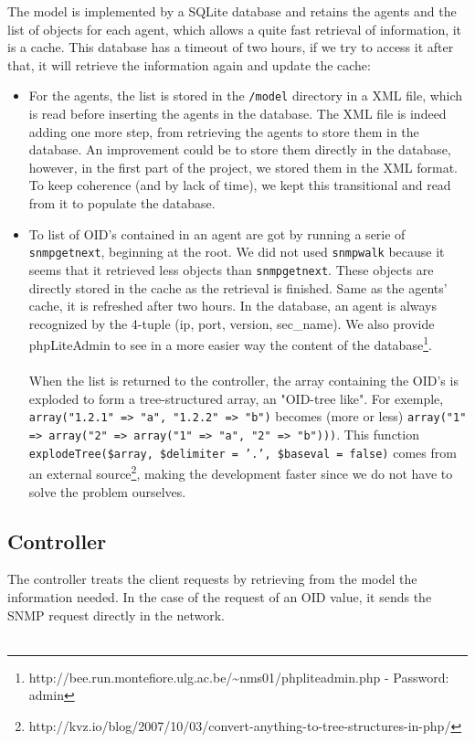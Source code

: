 \documentclass[a4paper,titlepage]{article}
\begin{document}
The model is implemented by a SQLite database and retains the agents and the list of objects for each agent, which allows a quite fast retrieval of information, it is a cache. This database has a timeout of two hours, if we try to access it after that, it will retrieve the information again and update the cache:
\begin{itemize}
	\item For the agents, the list is stored in the \texttt{/model} directory in a XML file, which is read before inserting the agents in the database. The XML file is indeed adding one more step, from retrieving the agents to store them in the database. An improvement could be to store them directly in the database, however, in the first part of the project, we stored them in the XML format. To keep coherence (and by lack of time), we kept this transitional and read from it to populate the database.

	\item To list of OID's contained in an agent are got by running a serie of \texttt{snmpgetnext}, beginning at the root. We did not used \texttt{snmpwalk} because it seems that it retrieved less objects than \texttt{snmpgetnext}. These objects are directly stored in the cache as the retrieval is finished. Same as the agents' cache, it is refreshed after two hours. In the database, an agent is always recognized by the 4-tuple (ip, port, version, sec\_name). We also provide phpLiteAdmin to see in a more easier way the content of the database\footnote{http://bee.run.montefiore.ulg.ac.be/\textasciitilde nms01/phpliteadmin.php - Password: admin}.
	\paragraph{}
	When the list is returned to the controller, the array containing the OID's is exploded to form a tree-structured array, an "OID-tree like". For exemple, \texttt{array("1.2.1" => "a", "1.2.2" => "b")} becomes (more or less) \texttt{array("1" => array("2" => array("1" => "a", "2" => "b")))}. This function \texttt{explodeTree(\$array, \$delimiter = '.', \$baseval = false)} comes from an external source\footnote{http://kvz.io/blog/2007/10/03/convert-anything-to-tree-structures-in-php/}, making the development faster since we do not have to solve the problem ourselves.
\end{itemize}


\subsection{Controller}
The controller treats the client requests by retrieving from the model the information needed. In the case of the request of an OID value, it sends the SNMP request directly in the network.\\ \\
\end{document}
